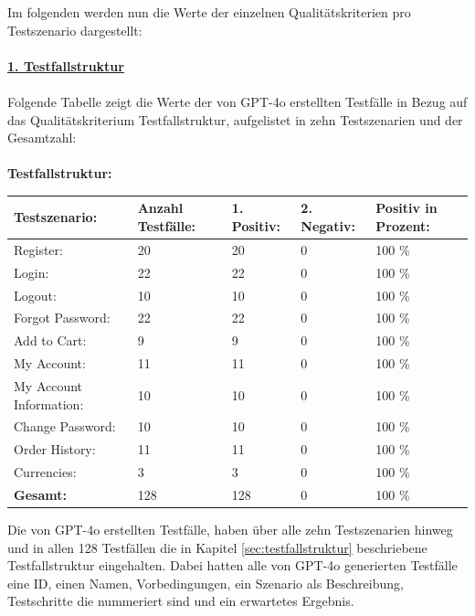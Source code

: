 \documentclass[12pt,toc=bib,toc=listof]{scrreprt}
\begin{document}
\noindent Im folgenden werden nun die Werte der einzelnen Qualitätskriterien pro Testszenario dargestellt:\\
\\
\textbf{\underline{1. Testfallstruktur}}\\
\\
Folgende Tabelle zeigt die Werte der von GPT-4o erstellten Testfälle in Bezug auf das Qualitätskriterium \glqq Testfallstruktur\grqq{}, aufgelistet in zehn Testszenarien und der Gesamtzahl:\\
\\
\textbf{Testfallstruktur:} 
\begin{table}[H]
 \begin{center}
\begin{tabularx}{\textwidth}{|X|X|X|X|X|}
\hline
\textbf{Testszenario:} & \textbf{Anzahl \newline Testfälle:} & \textbf{1. Positiv:} & \textbf{2. Negativ:}  & \textbf{Positiv in \newline Prozent:}\\ \hline
Register:  & 20 & 20 & 0 & 100 \%       \\ \hline
Login:  & 22 & 22 & 0 & 100 \%       \\ \hline
Logout:  & 10 & 10 & 0 & 100 \%       \\ \hline
Forgot \newline Password:  & 22 & 22 & 0 & 100 \%       \\ \hline
Add to Cart:  & 9 & 9 & 0 & 100 \%       \\ \hline
My Account:  & 11 & 11 & 0 & 100 \%       \\ \hline
My Account \newline Information:  & 10 & 10 & 0 &  100 \%       \\ \hline
Change \newline Password:  & 10 & 10 & 0 & 100 \%       \\ \hline
Order History:  & 11 & 11 & 0 & 100 \%       \\ \hline
Currencies: & 3 & 3 & 0 & 100 \% \\ \hline
\textbf{Gesamt:} & 128 & 128 & 0 & 100 \% \\ \hline
\end{tabularx}
\end{center}
\end{table}

\noindent Die von GPT-4o erstellten Testfälle, haben über alle zehn Testszenarien hinweg und in allen 128 Testfällen die in Kapitel \ref{sec:testfallstruktur} beschriebene Testfallstruktur eingehalten. Dabei hatten alle von GPT-4o generierten Testfälle eine ID, einen Namen, Vorbedingungen, ein Szenario als Beschreibung, Testschritte die nummeriert sind und ein erwartetes Ergebnis.
\newpage
\end{document}

